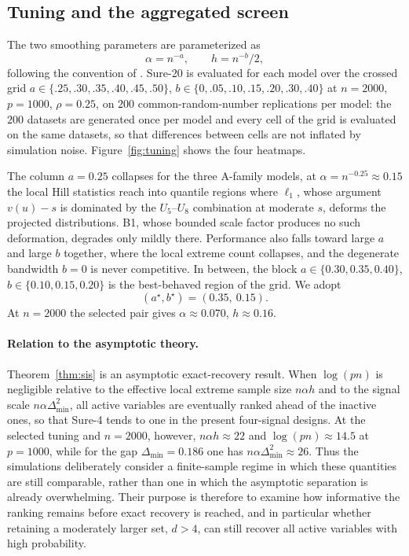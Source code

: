 \subsection{Tuning and the aggregated screen}\label{sec:tuning}

The two smoothing parameters are parameterized as
\[
 \alpha=n^{-a},\qquad h=n^{-b}/2,
\]
following the convention of \citet{gardesPodgorny2025}. Sure-20 is
evaluated for each model over the crossed grid
$a\in\{.25,.30,.35,.40,.45,.50\}$,
$b\in\{0,.05,.10,.15,.20,.30,.40\}$ at $n=2000$, $p=1000$,
$\rho=0.25$, on $200$ common-random-number replications per model: the
$200$ datasets are generated once per model and every cell of the grid
is evaluated on the same datasets, so that differences between cells
are not inflated by simulation noise. Figure~\ref{fig:tuning} shows the
four heatmaps.

The column $a=0.25$ collapses for the three A-family models, at $\alpha=n^{-0.25}\approx0.15$ the
local Hill statistics reach into quantile regions where $\ell_1$, whose
argument $v(u)-s$ is dominated by the $U_5$--$U_8$ combination at
moderate $s$, deforms the projected distributions. B1, whose bounded
scale factor produces no such deformation, degrades only mildly there. Performance also falls toward large $a$ and large $b$
together, where the local extreme count collapses, and the degenerate
bandwidth $b=0$ is never competitive. In between, the block
$a\in\{0.30,0.35, 0.40\}$, $b\in\{0.10,0.15,0.20\}$ is the best-behaved
region of the grid. We adopt
\[
 (a^\star,b^\star)=(0.35,\ 0.15).
\]
At $n=2000$ the selected pair gives $\alpha\approx0.070$, $h\approx0.16$.

\paragraph{Relation to the asymptotic theory.}
Theorem~\ref{thm:sis} is an asymptotic exact-recovery result. When $\log(pn)$ is negligible relative to the effective local extreme sample size $n\alpha h$ and to the signal scale $n\alpha\Delta_{\min}^2$, all active variables are eventually ranked ahead of the inactive ones, so that Sure-4 tends to one in the present four-signal designs. At the selected tuning and $n=2000$, however, $n\alpha h\approx22$ and $\log(pn)\approx14.5$ at $p=1000$, while for the gap $\Delta_{\min}=0.186$ one has $n\alpha \Delta_{\min}^2\approx26$. Thus the simulations deliberately consider a finite-sample regime in which these quantities are still comparable, rather than one in which the asymptotic separation is already overwhelming. Their purpose is therefore to examine how informative the ranking remains before exact recovery is reached, and in particular whether retaining a moderately larger set, $d>4$, can still recover all active variables with high probability.

